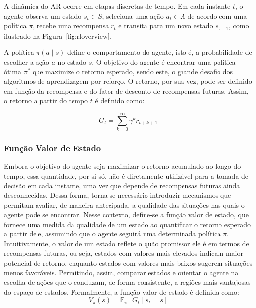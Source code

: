 A dinâmica do AR ocorre em etapas discretas de tempo. Em cada instante $t$, o agente observa um estado $s_t \in S$, seleciona uma ação $a_t \in A$ de acordo com uma política $\pi$, recebe uma recompensa $r_t$ e transita para um novo estado $s_{t+1}$, como ilustrado na Figura~\ref{fig:rloverview}.

A política $\pi(a \mid s)$ define o comportamento do agente, isto é, a probabilidade de escolher a ação $a$ no estado $s$. O objetivo do agente é encontrar uma política ótima $\pi^*$ que maximize o retorno esperado, sendo este, o grande desafio dos algoritmos de aprendizagem por reforço. O retorno, por sua vez, pode ser definido em função da recompensa e do fator de desconto de recompensas futuras. Assim, o retorno a partir do tempo $t$ é definido como:

$$
G_t = \sum_{k=0}^{\infty} \gamma^k r_{t+k+1}
$$

\subsubsection{Função Valor de Estado}

Embora o objetivo do agente seja maximizar o retorno acumulado ao longo do tempo, essa quantidade, por si só, não é diretamente utilizável para a tomada de decisão em cada instante, uma vez que depende de recompensas futuras ainda desconhecidas. Dessa forma, torna-se necessário introduzir mecanismos que permitam avaliar, de maneira antecipada, a qualidade das situações nas quais o agente pode se encontrar. Nesse contexto, define-se a função valor de estado, que fornece uma medida da qualidade de um estado ao quantificar o retorno esperado a partir dele, assumindo que o agente seguirá uma determinada política $\pi$. Intuitivamente, o valor de um estado reflete o quão promissor ele é em termos de recompensas futuras, ou seja, estados com valores mais elevados indicam maior potencial de retorno, enquanto estados com valores mais baixos sugerem situações menos favoráveis. Permitindo, assim, comparar estados e orientar o agente na escolha de ações que o conduzam, de forma consistente, a regiões mais vantajosas do espaço de estados. Formalmente, a função valor de estado é definida como:
$$
V_\pi(s) = \mathbb{E}_\pi [G_t \mid s_t = s]
$$


